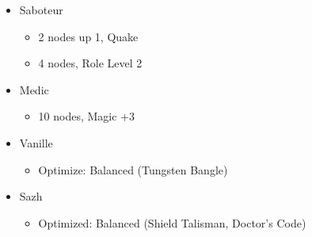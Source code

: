 \begin{multicols}{2}
\begin{menu}
\begin{itemize}
\begin{itemize}
\begin{itemize}
\begin{itemize}
            \end{itemize}
            \item Saboteur
            \begin{itemize}
                \item 2 nodes up 1, Quake
                \item 4 nodes, Role Level 2
            \end{itemize}
            \item Medic
            \begin{itemize}
                \item 10 nodes, Magic +3
            \end{itemize}
        \end{itemize}
    \end{itemize}
    \columnbreak
    \equip
    \begin{itemize}
        \item Vanille
        \begin{itemize}
            \item Optimize: Balanced (Tungsten Bangle)
        \end{itemize}
        \item Sazh
        \begin{itemize}
            \item Optimized: Balanced (Shield Talisman, Doctor's Code)
        \end{itemize}
    \end{itemize}
\end{itemize}
\end{menu}
\renewcommand{\first}{[1] Slash \& Burn (\com/\rav)}
\renewcommand{\second}{[2] War \& Peace (\com/\med)}
\renewcommand{\third}{[3] Tide Turner (\syn/\sab)}
\renewcommand{\fourth}{[4] }
\renewcommand{\fifth}{[5] Undermine (\rav/\sab)}
\renewcommand{\sixth}{[6] Divide \& Conquer (\com/\sab)}


\end{multicols}
